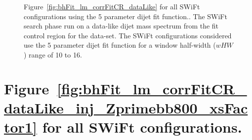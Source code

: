 \begin{figure}
{}
\vspace{10pt}
\caption[Figure~\ref{fig:bhFit_lm_corrFitCR_dataLike} for all SWiFt configurations using the 5 parameter dijet fit function..]
{\label{fig:app-bhFit_lm_corrFitCR_dataLike_5para}
  Figure~\ref{fig:bhFit_lm_corrFitCR_dataLike} for all SWiFt configurations using the 5 parameter dijet fit function..
  The SWiFt search phase run on a data-like dijet mass spectrum
  from the fit control region for the \lm{} data-set.
  The SWiFt configurations considered use the 5 parameter dijet fit function for a window half-width ($wHW$) range of 10 to 16.
}
\end{figure}

\clearpage
\section{Figure~\ref{fig:bhFit_lm_corrFitCR_dataLike_inj_Zprimebb800_xsFactor1} for all SWiFt configurations.}
\vspace{5em}

